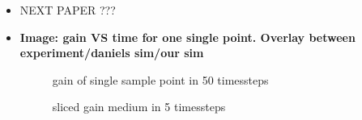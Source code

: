 \begin{itemize}

  \item NEXT PAPER ???

  \item \textbf{Image: gain VS time for one single point. Overlay between
    experiment/daniels sim/our sim}
    \begin{figure}[H]
      \centerline{
        }
      \caption{gain of single sample point in 50 timessteps}
      \label{plot:benchmark}
    \end{figure}
    \begin{figure}[H]
      \centerline{
        }
      \caption{sliced gain medium in 5 timessteps}
      \label{graphic:benchmark_4_timeslices}
    \end{figure}


\end{itemize}
